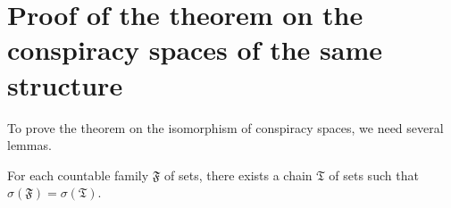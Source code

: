 \chapter{Proof of the theorem on the conspiracy spaces of the same structure}\label{app:C}

To prove the theorem on the isomorphism of conspiracy spaces, we need several lemmas. %

\begin{lemma}\label{lemma:card}
	For each countable family $\mathfrak{F}$ of sets, there exists a chain $\mathfrak{T}$ of sets such that $\sigma(\mathfrak{F}) = \sigma(\mathfrak{T})$. %
\end{lemma}


